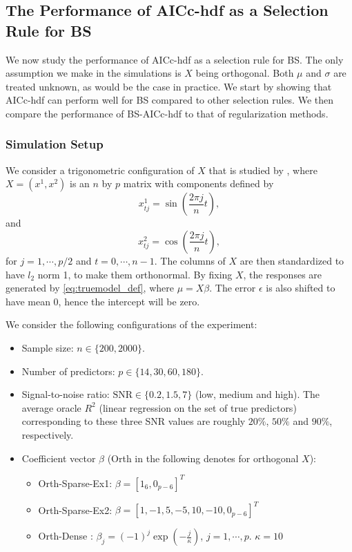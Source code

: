 \subsection{The Performance of AICc-hdf as a Selection Rule for BS}
We now study the performance of AICc-hdf as a selection rule for BS. The only assumption we make in the simulations is $X$ being orthogonal. Both $\mu$ and $\sigma$ are treated unknown, as would be the case in practice. We start by showing that AICc-hdf can perform well for BS compared to other selection rules. We then compare the performance of BS-AICc-hdf to that of regularization methods. 

\subsubsection{Simulation Setup}
\label{sec:simulation_setup_orthx}
We consider a trigonometric configuration of $X$ that is studied by \citet{Hurvich1991}, where $X=(x^1,x^2)$ is an $n$ by $p$ matrix with components defined by 
$$ x_{tj}^1 = \sin\left(\frac{2\pi j}{n}t\right),$$
and 
$$ x_{tj}^2 = \cos\left(\frac{2\pi j}{n}t\right),$$
for $j=1,\cdots,p/2$ and $t=0,\cdots,n-1$. The columns of $X$ are then standardized to have $l_2$ norm 1, to make them orthonormal. By fixing $X$, the responses are generated by \eqref{eq:truemodel_def}, where $\mu=X\beta$. The error $\epsilon$ is also shifted to have mean $0$, hence the intercept will be zero. 

We consider the following configurations of the experiment:
\begin{itemize}
	\item Sample size: $n \in \{200, 2000\}$.
	\item Number of predictors: $p \in \{14,30,60,180\}$.
	\item Signal-to-noise ratio: $\text{SNR} \in \{0.2,1.5,7\}$ (low, medium and high). The average oracle $R^2$ (linear regression on the set of true predictors) corresponding to these three SNR values are roughly $20\%$, $50\%$ and $90\%$, respectively.
	\item Coefficient vector $\beta$ (Orth in the following denotes for orthogonal $X$):
	\begin{itemize}
		\item Orth-Sparse-Ex1: $\beta=[1_6,0_{p-6}]^T$
		\item Orth-Sparse-Ex2: $\beta=[1,-1,5,-5,10,-10,0_{p-6}]^T$
		\item Orth-Dense \citep{Taddy2017}: $\beta_j = (-1)^j \exp(-\frac{j}{\kappa})$, $j=1,\cdots,p$. $\kappa=10$ 
	\end{itemize}
\end{itemize}

